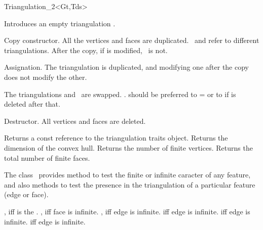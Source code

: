 \begin{ccClassTemplate}{Triangulation_2<Gt,Tds>}
\ccCreation
{}
\ccThreeToTwo

{Introduces an empty triangulation \ccVar.}


{Copy constructor. All the vertices and faces are duplicated.
\ccVar\ and 
refer to different triangulations. After the copy,
 if  is modified, \ccVar\ is not. }

{Assignation. The triangulation is duplicated, and modifying one after the
copy does not modify the other.}

{The triangulations  and \ccVar\ are swapped.
\ccVar.  should be preferred to  =  or to
 if  is deleted after that.}


{Destructor. All vertices and faces are deleted.}


\ccAccessFunctions
{}
{Returns a const reference to the triangulation traits object.}
\ccGlue
{}
{Returns the dimension of the convex hull.}
\ccGlue
{}
{Returns the number of finite vertices.}
\ccGlue
{}
{Returns the total number of finite faces.}



The class \ccClassTemplateName\ provides method to test
the finite or infinite caracter of any feature,
and also methods to test the presence in the triangulation
of a particular feature (edge or face).

{, iff  is the .}
\ccGlue
{}
{, iff face  is infinite.}
\ccGlue
{}
{, iff edge  is infinite.}
\ccGlue
{}
{ iff edge  is infinite.}
\ccGlue
{}
{ iff edge  is infinite.}
\ccGlue
{}
{ iff edge  is infinite.}


\end{ccClassTemplate}
